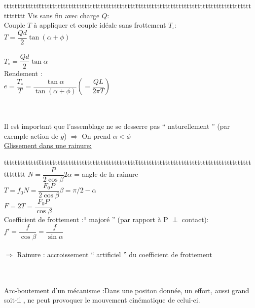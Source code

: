 \begin{bluebox}
\begin{tabbing}
ttttttttttttt\=tttttttttttttttttttttttttttttttttttt\=ttttttttttttttttttttttttttttttttttttttttttttttttttt\kill
Vis sans fin avec charge $Q$:\\
Couple $T$ à appliquer et couple idéale sans frottement $T_\circ$:\\
\> $T = \dfrac{Qd}{2}\tan(\alpha+\phi)$\\\\
\> $T_\circ = \dfrac{Qd}{2}\tan\alpha$\\
Rendement :\\
\>$e=\dfrac{T_\circ}{T} = \dfrac{\tan\alpha}{\tan(\alpha+\phi)} (= \dfrac{QL}{2\pi T}) $
\end{tabbing}
\end{bluebox}\\\\

Il est important que l'assemblage ne se desserre pas “ naturellement ” (par exemple action de $g$) $\Rightarrow$ On prend $\alpha < \phi$\\

\underline{Glissement dans une rainure:}\\
\begin{bluebox}
\begin{tabbing}
ttttttttttttt\=tttttttttttttttttttttttttttttttttttt\=ttttttttttttttttttttttttttttttttttttttttttttttttttt\kill
\> $N=\dfrac{P}{2\cos\beta}$\>$2\alpha$ = angle de la rainure\\
\> $T = f_0N = \dfrac{F_0P}{2\cos\beta}$\>$\beta = \pi/2-\alpha$\\
\> $F = 2T = \dfrac{F_0P}{\cos\beta}$\\
Coefficient de frottement :“ majoré ” (par rapport à P $\perp$ contact):\\
\>$f' = \dfrac{f}{\cos\beta}=\dfrac{f}{\sin\alpha}$\\\\
$\Rightarrow$ Rainure : accroissement “ {\color{orange}artificiel} ” du coefficient de frottement
\end{tabbing}
\end{bluebox}\\\\

{\color{orange}Arc-boutement} d’un mécanisme :Dans une positon donnée, un effort, aussi grand soit-il , ne peut provoquer le mouvement cinématique de celui-ci.\\

